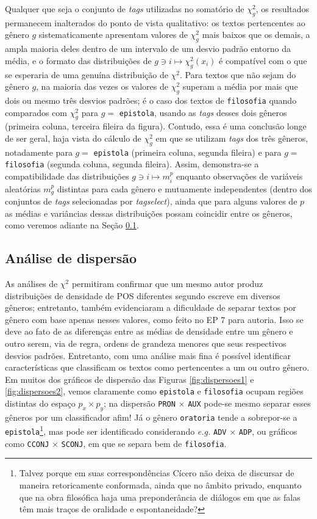 \documentclass[10pt,a4paper,onecolumn]{article}
\theoremstyle{definition}
\theoremstyle{remark}
\begin{document}
Qualquer que seja o conjunto de \emph{tags} utilizadas no somatório de $\chi^2_g$, os resultados permanecem inalterados do ponto de vista qualitativo: os textos pertencentes ao gênero $g$ sistematicamente apresentam valores de $\chi^2_g$ mais baixos que os demais, a ampla maioria deles dentro de um intervalo de um desvio padrão entorno da média, e o formato das distribuições de $g \ni i \mapsto \chi^2_g(x_i)$ é compatível com o que se esperaria de uma genuína distribuição de $\chi^2$. Para textos que não sejam do gênero $g$, na maioria das vezes os valores de $\chi^2_g$ superam a média por mais que dois ou mesmo três desvios padrões; é o caso dos textos de \texttt{filosofia} quando comparados com $\chi^2_g$ para $g = $ \texttt{epistola}, usando as \emph{tags} desses dois gêneros (primeira coluna, terceira fileira da figura). Contudo, essa é uma conclusão longe de ser geral, haja vista do cálculo de $\chi^2_g$ em que se utilizam \emph{tags} dos três gêneros, notadamente para $g =$ \texttt{epistola} (primeira coluna, segunda fileira) e para $g = $ \texttt{filosofia}  (segunda coluna, segunda fileira). Assim, demonstra-se a compatibilidade das distribuições $g \ni i \mapsto m^p_i$ enquanto observações de variáveis aleatórias $m_g^p$ distintas para cada gênero e mutuamente independentes (dentro dos conjuntos de \emph{tags} selecionadas por \emph{tagselect}), ainda que para alguns valores de $p$ as médias e variâncias dessas distribuições possam coincidir entre os gêneros, como veremos adiante na Seção \ref{sec:dispersao}.

\subsection{Análise de dispersão}\label{sec:dispersao}
As análises de $\chi^2$ permitiram confirmar que um mesmo autor produz distribuições de densidade de POS diferentes segundo escreve em diversos gêneros; entretanto, também evidenciaram a dificuldade de separar textos por gênero com base apenas nesses valores, como feito no EP 7 para autoria. Isso se deve ao fato de as diferenças entre as médias de densidade entre um gênero e outro serem, via de regra, ordens de grandeza menores que seus respectivos desvios padrões. Entretanto, com uma análise mais fina é possível identificar características que classificam os textos como pertencentes a um ou outro gênero. Em muitos dos gráficos de dispersão das Figuras \ref{fig:dispersoes1} e \ref{fig:dispersoes2}, vemos claramente como \texttt{epistola} e \texttt{filosofia} ocupam regiões distintas do espaço $p_x \times p_y$; na dispersão \texttt{PRON} $\times$ \texttt{AUX} pode-se mesmo separar esses gêneros por um classificador afim! Já o gênero \texttt{oratoria} tende a sobrepor-se a \texttt{epistola}\footnote{Talvez porque em suas correspondências Cícero não deixa de discursar de maneira retoricamente conformada, ainda que no âmbito privado, enquanto que na obra filosófica haja uma preponderância de diálogos em que as falas têm mais traços de oralidade e espontaneidade?}, mas pode ser identificado considerando \emph{e.g.} \texttt{ADV} $\times$ \texttt{ADP}, ou gráficos como \texttt{CCONJ} $\times$ \texttt{SCONJ}, em que se separa bem de \texttt{filosofia}.
\end{document}
